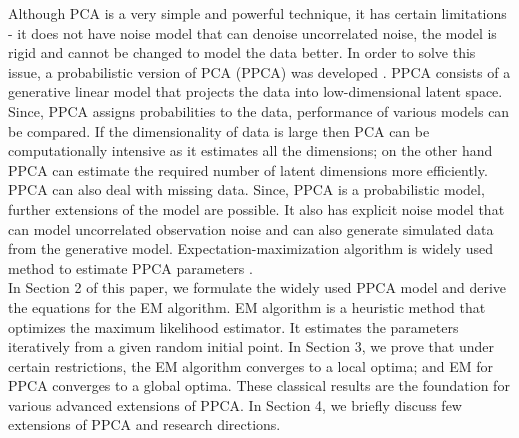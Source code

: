 Although PCA is a very simple and powerful technique, it has certain limitations - it does not have noise model that can denoise uncorrelated noise, the model is rigid and cannot be changed to model the data better. In order to solve this issue, a probabilistic version of PCA (PPCA) was developed \cite{tipping1999probabilistic, roweis1997algorithms}. PPCA consists of a generative linear model that projects the data into low-dimensional latent space. Since, PPCA assigns probabilities to the data, performance of various models can be compared. If the dimensionality of data is large then PCA can be computationally intensive as it estimates all the dimensions; on the other hand PPCA can estimate the required number of latent dimensions more efficiently. PPCA can also deal with missing data. Since, PPCA is a probabilistic model, further extensions of the model are possible. It also has explicit noise model that can model uncorrelated observation noise and can also generate simulated data from the generative model. Expectation-maximization algorithm is widely used method to estimate PPCA parameters \cite{tipping1999probabilistic, roweis1997algorithms, moon1996expectation, wu1983convergence}. \\

In Section 2 of this paper, we formulate the widely used PPCA model \cite{tipping1999probabilistic, roweis1997algorithms} and derive the equations for the EM algorithm. EM algorithm is a heuristic method that optimizes the maximum likelihood estimator. It estimates the parameters iteratively from a given random initial point. In Section 3, we prove that under certain restrictions, the EM algorithm converges to a local optima; and EM for PPCA converges to a global optima. These classical results \cite{tipping1999probabilistic, roweis1997algorithms, dempster1977maximum, zangwill1967non, rao1973linear, wu1983convergence} are the foundation for various advanced extensions of PPCA. In Section 4, we briefly discuss few extensions of PPCA and research directions. 






